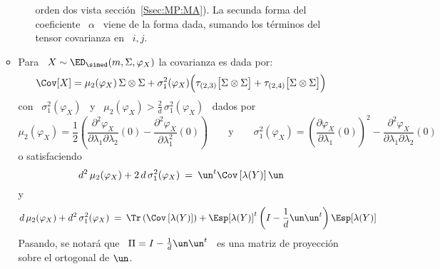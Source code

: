\begin{itemize}
\begin{itemize}
\begin{itemize}
  orden dos vista secci\'on~\ref{Ssec:MP:MA}).  La secunda forma del coeficiente
  \  $\alpha$ \  viene  de la  forma  dada, sumando  los  t\'erminos del  tensor
  covarianza en \ $i, j$.
 \end{itemize}
\item Para \ $X \sim \ED_\simed(m,\Sigma,\varphi_X)$ la covarianza es dada por:
  \[
  \Cov[X] =  \mu_2(\varphi_X) \,  \Sigma \otimes \Sigma  + \sigma_1^2(\varphi_X)
  \Big( \tau_{(2,3)}\big[ \Sigma \otimes \Sigma \big] + \tau_{(2,4)}\big[ \Sigma
  \otimes \Sigma \big] \Big)
  \]
  con  \  $\sigma_1^2(\varphi_X)$  \  y  \ $\mu_2(\varphi_X)  >  \frac{2}{d}  \,
  \sigma_1^2(\varphi_X)$ \ dados por
  \[
  \mu_2(\varphi_X)   =  \frac12   \left(   \frac{\partial^2  \varphi_X}{\partial
      \lambda_1  \partial \lambda_2}(0)  -  \frac{\partial^2 \varphi_X}{\partial
      \lambda_1^2}(0)  \right) \qquad  \mbox{y}  \qquad \sigma_1^2(\varphi_X)  =
  \left(   \frac{\partial    \varphi_X}{\partial   \lambda_1}(0)   \right)^2   -
  \frac{\partial^2 \varphi_X}{\partial \lambda_1 \partial \lambda_2}(0)
  \]
  o satisfaciendo
  \[
  d^2  \, \mu_2(\varphi_X)  + 2  \,  d \,  \sigma_1^2(\varphi_X) \:  = \:  \un^t
  \Cov\left[ \lambda(Y) \right] \un
  \]
  y
  \[
  d  \,  \mu_2(\varphi_X) +  d^2  \,  \sigma_1^2(\varphi_X)  \: =  \:  \Tr\left(
    \Cov\left[  \lambda(Y) \right]  \right) +  \Esp[ \lambda(Y)  ]^t \left(  I -
    \frac{1}{d} \un \un^t \right) \Esp[ \lambda(Y) ]
  \]
  Pasando, se notar\'a que  \ $\Pi = I - \frac{1}{d} \un  \un^t$ \ es una matriz
  de  proyecci\'on  sobre  el  ortogonal  de  $\un$.


\end{itemize}
\end{itemize}
